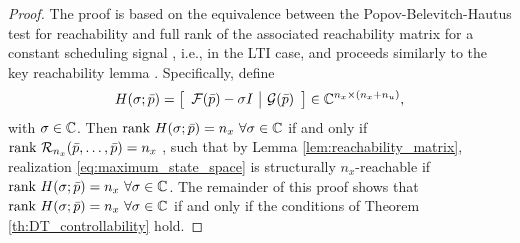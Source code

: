 \begin{proof}
    The proof is based on the equivalence between the Popov-Belevitch-Hautus test for reachability and full rank of the associated reachability matrix for a constant scheduling signal \cite{hespanha2018linear}, i.e., in the LTI case, and proceeds similarly to the key reachability lemma \cite[Lemma 3.4.7]{Goodwin1984}. Specifically, define 
    \begin{equation}
        H(\sigma; \bar{p}) = \left[\begin{array}{c|c} \mathcal{F}(\bar{p}) - \sigma I & \mathcal{G}(\bar{p}) \end{array}\right] \in \mathbb{C}^{n_x \times (n_x + n_u)},
    \end{equation}
    with $\sigma\in\mathbb{C}$. Then $\textrm{rank}\ H(\sigma; \bar{p}) = n_x \ \forall \sigma \in \mathbb{C}$ if and only if $\rank\ \Rcal_{n_x}(\bar{p},\ldots,\bar{p}) = n_x$ \cite{hespanha2018linear}, such that by Lemma \ref{lem:reachability_matrix}, realization \eqref{eq:maximum_state_space} is structurally $n_x$-reachable if $\textrm{rank}\ H(\sigma; \bar{p}) = n_x \ \forall \sigma \in \mathbb{C}$. The remainder of this proof shows that $\textrm{rank}\ H(\sigma; \bar{p}) = n_x \ \forall \sigma \in \mathbb{C}$ if and only if the conditions of Theorem \ref{th:DT_controllability} hold. 
    

\end{proof}
